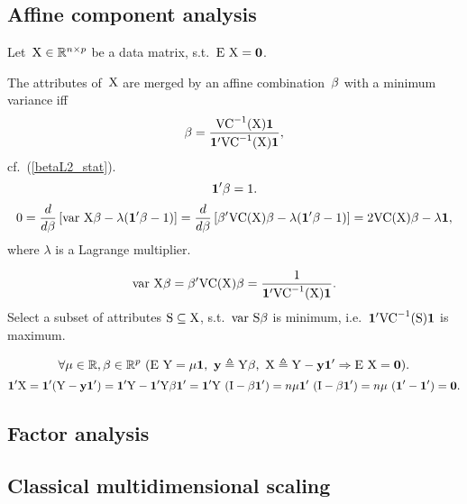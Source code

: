 \documentclass[10pt,a4paper]{article}
\theoremstyle{plain} \newtheorem{Lem}{Lemma}
\begin{document}
\subsection{Affine component analysis}

Let~$\mathrm X \in \mathbb R^{n \times p}$ be a data matrix,
s.t.~$\mathrm E \  \mathrm X = \mathbf 0$.

The attributes of~$\mathrm X$ are merged by an affine combination~$\mathbf \beta$ with a minimum variance iff
$$ \mathbf \beta = \frac {\mathrm {VC}^{-1}(\mathrm X) \mathbf 1} {\mathbf 1' \mathrm {VC}^{-1}(\mathrm X) \mathbf 1}, $$
cf.~(\ref{betaL2_stat}).
$$ \mathbf 1' \mathbf \beta = 1. $$
\proof
{
$$ 0 = \frac d {d \mathbf \beta} \left[ \mathrm {var} \  \mathrm X \mathbf \beta - \lambda (\mathbf 1' \beta - 1) \right]
     = \frac d {d \mathbf \beta} \left[ \mathbf \beta' \mathrm {VC}(\mathrm X) \mathbf \beta - \lambda (\mathbf 1' \beta - 1) \right]
     = 2 \mathrm {VC}(\mathrm X) \mathbf \beta - \lambda \mathbf 1, $$
where $\lambda$ is a Lagrange multiplier.
}

$$ \mathrm {var} \  \mathrm X \mathbf \beta = \mathbf \beta' \mathrm {VC}(\mathrm X) \mathbf \beta = \frac 1 {\mathbf 1' \mathrm {VC}^{-1}(\mathrm X) \mathbf 1}. $$
\comm
{Select a subset of attributes $\mathrm S \subseteq \mathrm X$, s.t.~$\mathrm {var} \  \mathrm S \mathbf \beta$ is minimum,
    i.e.~$\mathbf 1' \mathrm {VC}^{-1}(\mathrm S) \mathbf 1$ is maximum.
}

$$ \forall \mu \in \mathbb R, \mathbf \beta \in \mathbb R^p \
  (\mathrm E \  \mathrm Y = \mu \mathbf 1, \ \mathbf y \triangleq \mathrm Y \mathbf \beta, \ \mathrm X \triangleq \mathrm Y - \mathbf y \mathbf 1' \Rightarrow \mathrm E \  {\mathrm X} = \mathbf 0).
$$
\proof
{
    $$ \mathbf 1' \mathrm X = \mathbf 1' (\mathrm Y - \mathbf y \mathbf 1')
    = \mathbf 1' \mathrm Y - \mathbf 1' \mathrm Y \mathbf \beta \mathbf 1'
    = \mathbf 1' \mathrm Y \ (\mathrm I - \mathbf \beta \mathbf 1')
    = n \mu \mathbf 1' \ (\mathrm I - \mathbf \beta \mathbf 1')
    = n \mu \ (\mathbf 1' - \mathbf 1')
    = \mathbf 0.
    $$
}





\subsection {Factor analysis}
\comm{}


\subsection {Classical multidimensional scaling}
\end{document}
